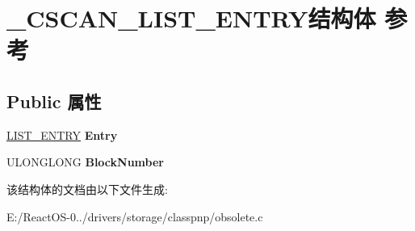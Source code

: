 \hypertarget{struct___c_s_c_a_n___l_i_s_t___e_n_t_r_y}{}\section{\+\_\+\+C\+S\+C\+A\+N\+\_\+\+L\+I\+S\+T\+\_\+\+E\+N\+T\+R\+Y结构体 参考}
\label{struct___c_s_c_a_n___l_i_s_t___e_n_t_r_y}
\subsection*{Public 属性}
\begin{DoxyCompactItemize}
\item 
\mbox{\label{struct___c_s_c_a_n___l_i_s_t___e_n_t_r_y_a2a15cfe9621bf778da377bd824dad011}} 
\hyperlink{struct___l_i_s_t___e_n_t_r_y}{L\+I\+S\+T\+\_\+\+E\+N\+T\+RY} {\bfseries Entry}
\item 
\mbox{\label{struct___c_s_c_a_n___l_i_s_t___e_n_t_r_y_abf689d91f30e6acf042031c4ff8a392a}} 
U\+L\+O\+N\+G\+L\+O\+NG {\bfseries Block\+Number}
\end{DoxyCompactItemize}


该结构体的文档由以下文件生成\+:\begin{DoxyCompactItemize}
\item 
E\+:/\+React\+O\+S-\/0../drivers/storage/classpnp/obsolete.\+c\end{DoxyCompactItemize}
